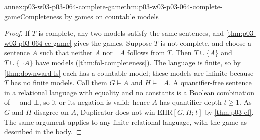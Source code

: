 \begin{annexitem}{annex:p03-w03-p03-064-complete-game}{thm:p03-w03-p03-064-complete-game}{Completeness by games on countable models}
\begin{proof}
If \(T\) is complete, any two models satisfy the same sentences, and
\cref{thm:p03-w03-p03-064-ee-game} gives the games.  Suppose \(T\) is not
complete, and choose a sentence \(A\) such that neither \(A\) nor \(\neg A\)
follows from \(T\).  Then \(T\cup\{A\}\) and \(T\cup\{\neg A\}\) have models
(\cref{thm:fol-completeness}).  The language is finite, so by
\cref{thm:downward-ls} each has a countable model; these models are infinite
because \(T\) has no finite models.  Call them \(G\models A\) and
\(H\models\neg A\).  A quantifier-free sentence in a relational language
with equality and no constants is a Boolean combination of \(\top\) and
\(\bot\), so it or its negation is valid; hence \(A\) has quantifier depth
\(t\geq1\).  As \(G\) and \(H\) disagree on \(A\), Duplicator does not win
\(\mathrm{EHR}[G,H;t]\) by \cref{thm:p03-ef}.  The same argument applies to any
finite relational language, with the game as described in the body.
\end{proof}
\end{annexitem}

